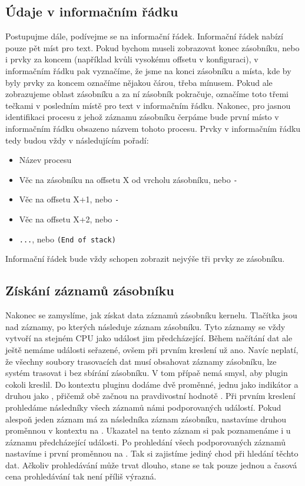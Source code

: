 \subsection{Údaje v informačním řádku}
Postupujme dále, podívejme se na informační řádek. Informační řádek nabízí pouze pět míst pro text. Pokud bychom museli zobrazovat konec zásobníku, nebo i prvky za koncem (například kvůli vysokému offsetu v konfiguraci), v informačním řádku pak vyznačíme, že jsme na konci zásobníku a místa, kde by byly prvky za koncem označíme nějakou čárou, třeba mínusem. Pokud ale zobrazujeme oblast zásobníku a za ní zásobník pokračuje, označíme toto třemi tečkami v posledním místě pro text v informačním řádku. Nakonec, pro jasnou identifikaci procesu z jehož záznamu zásobníku čerpáme bude první místo v informačním řádku obsazeno názvem tohoto procesu. Prvky v informačním řádku tedy budou vždy v následujícím pořadí:
\begin{itemize}
  \item Název procesu
  \item Věc na zásobníku na offsetu X od vrcholu zásobníku, nebo \texttt{-}
  \item Věc na offsetu X+1, nebo \texttt{-}
  \item Věc na offsetu X+2, nebo \texttt{-}
  \item \texttt{...}, nebo \texttt{(End of stack)}
\end{itemize}
Informační řádek bude vždy schopen zobrazit nejvýše tři prvky ze zásobníku.

\subsection{Získání záznamů zásobníku}
Nakonec se zamyslíme, jak získat data záznamů zásobníku kernelu. Tlačítka jsou nad záznamy, po kterých následuje záznam zásobníku. Tyto záznamy se vždy vytvoří na stejném CPU jako událost jim předcházející. Během načítání dat ale ještě nemáme události seřazené, ovšem při prvním kreslení už ano. Navíc neplatí, že všechny soubory trasovacích dat musí obsahovat záznamy zásobníku, lze systém trasovat i bez sbírání zásobníku. V tom přípaě nemá smysl, aby plugin cokoli kreslil. Do kontextu pluginu dodáme dvě proměnné, jednu jako indikátor  a druhou jako , přičemž obě začnou na pravdivostní hodnotě . Při prvním kreslení prohledáme následníky všech záznamů námi podporovaných událostí. Pokud alespoň jeden záznam má za následníka záznam zásobníku, nastavíme druhou proměnnou v kontextu na . Ukazatel na tento záznam si pak poznamenáme i u záznamu předcházející události. Po prohledání všech podporovaných záznamů nastavíme i první proměnnou na . Tak si zajistíme jediný chod při hledání těchto dat. Ačkoliv prohledávání může trvat dlouho, stane se tak pouze jednou a časová cena prohledávání tak není příliš výrazná.

